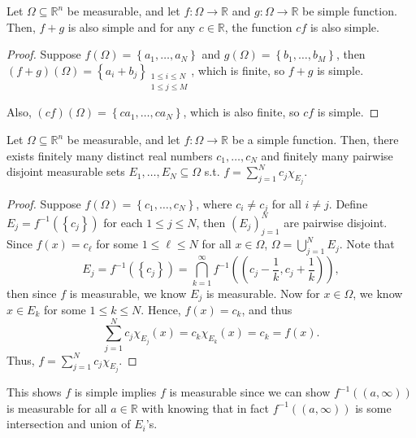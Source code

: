 \begin{lemma}
    Let \(\Omega \subseteq \mathbb{R} ^n\) be measurable, and let \(f: \Omega \to \mathbb{R}\) and \(g: \Omega \to \mathbb{R}\) be simple function. Then, \(f + g\) is also simple and for any \(c \in \mathbb{R}\), the function \(cf\) is also simple.      
\end{lemma}

\begin{proof}
    Suppose \(f(\Omega) = \left\{ a_1, \dots , a_N \right\} \) and \(g(\Omega) = \left\{ b_1, \dots , b_M \right\} \), then \((f + g)(\Omega) = \left\{ a_i + b_j \right\}_{\substack{1 \le i \le N \\ 1 \le j \le M}} \), which is finite, so \(f + g\) is simple. 

    Also, \((cf)(\Omega) = \left\{ ca_1, \dots , ca_N \right\} \), which is also finite, so \(cf\) is simple.      
\end{proof}

\begin{lemma}
    Let \(\Omega \subseteq \mathbb{R} ^n\) be measurable, and let \(f: \Omega \to \mathbb{R}\) be a simple function. Then, there exists finitely many distinct real numbers \(c_1, \dots , c_N\) and finitely many pairwise disjoint measurable sets \(E_1, \dots , E_N \subseteq \Omega\) s.t. \(f = \sum_{j=1}^N c_j \chi _{E_j} \).     
\end{lemma}

\begin{proof}
    Suppose \(f(\Omega ) = \left\{ c_1, \dots , c_N \right\} \), where \(c_i \neq c_j\) for all \(i \neq j\). Define \(E_j = f^{-1} (\left\{ c_j \right\} )\) for each \(1 \le j \le N\), then \(\left( E_j \right)_{j=1}^N \) are pairwise disjoint. Since \(f(x) = c_{\ell } \) for some \(1 \le \ell \le N\) for all \(x \in \Omega\), \(\Omega = \bigcup_{j=1}^{N} E_j \). Note that 
    \[
        E_j = f^{-1} (\left\{ c_j \right\} ) = \bigcap_{k=1}^{\infty} f^{-1} \left( \left( c_j - \frac{1}{k}, c_j + \frac{1}{k} \right)  \right),  
    \]       
    then since \(f\) is measurable, we know \(E_j\) is measurable. Now for \(x \in \Omega\), we know \(x \in E_k\) for some \(1 \le k \le N\). Hence, \(f(x) = c_k\), and thus 
    \[
        \sum_{j=1}^N c_j \chi _{E_j} (x) = c_k \chi _{E_k} (x) = c_k = f(x). 
    \]      
    Thus, \(f = \sum_{j=1}^N c_j \chi _{E_j} \). 
\end{proof}

\begin{remark}
    This shows \(f\) is simple implies \(f\) is measurable since we can show \(f^{-1} ((a, \infty))\) is measurable for all \(a \in \mathbb{R}\) with knowing that in fact \(f^{-1}((a, \infty))\) is some intersection and union of \(E_i\)'s.      
\end{remark}


